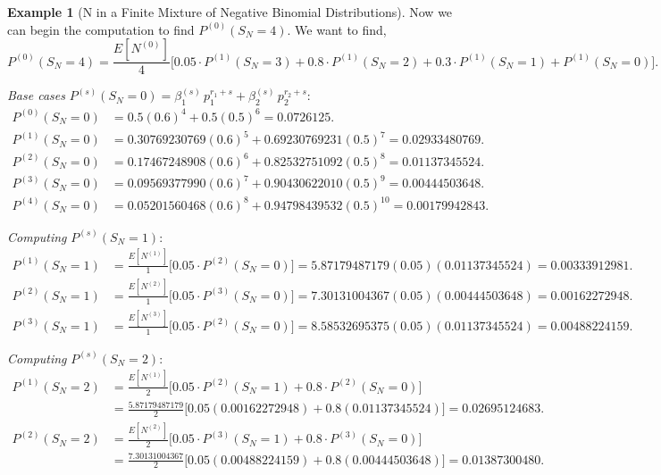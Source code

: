 \documentclass[11pt]{amsart}
\theoremstyle{definition}
\newtheorem{example}{Example}
\theoremstyle{plain}
\begin{document}
\begin{example}[N in a Finite Mixture of Negative Binomial Distributions]
Now we can begin the computation to find $P^{(0)}(S_N = 4)$.  We want to find,
\[
    P^{(0)}(S_N = 4)
    = \frac{E[N^{(0)}]}{4}
      \bigl[0.05 \cdot P^{(1)}(S_N = 3) + 0.8 \cdot P^{(1)}(S_N = 2)
      + 0.3 \cdot P^{(1)}(S_N = 1) + P^{(1)}(S_N = 0)\bigr].
\]

\noindent\textit{Base cases}
$P^{(s)}(S_N = 0) = \beta_1^{(s)}\,p_1^{r_1+s} + \beta_2^{(s)}\,p_2^{r_2+s}$:
\begin{align*}
P^{(0)}(S_N = 0)
    &= 0.5(0.6)^4 + 0.5(0.5)^6 = 0.0726125. \\
P^{(1)}(S_N = 0)
    &= 0.30769230769(0.6)^5 + 0.69230769231(0.5)^7
     = 0.02933480769. \\
P^{(2)}(S_N = 0)
    &= 0.17467248908(0.6)^6 + 0.82532751092(0.5)^8
     = 0.01137345524. \\
P^{(3)}(S_N = 0)
    &= 0.09569377990(0.6)^7 + 0.90430622010(0.5)^9
     = 0.00444503648. \\
P^{(4)}(S_N = 0)
    &= 0.05201560468(0.6)^8 + 0.94798439532(0.5)^{10}
     = 0.00179942843.
\end{align*}

\noindent\textit{Computing} $P^{(s)}(S_N = 1)$:
\begin{align*}
P^{(1)}(S_N = 1)
    &= \frac{E[N^{(1)}]}{1}\bigl[0.05 \cdot P^{(2)}(S_N = 0)\bigr]
     = 5.87179487179(0.05)(0.01137345524) = 0.00333912981. \\
P^{(2)}(S_N = 1)
    &= \frac{E[N^{(2)}]}{1}\bigl[0.05 \cdot P^{(3)}(S_N = 0)\bigr]
     = 7.30131004367(0.05)(0.00444503648) = 0.00162272948. \\
P^{(3)}(S_N = 1)
    &= \frac{E[N^{(3)}]}{1}\bigl[0.05 \cdot P^{(2)}(S_N = 0)\bigr]
     = 8.58532695375(0.05)(0.01137345524) = 0.00488224159.
\end{align*}

\noindent\textit{Computing} $P^{(s)}(S_N = 2)$:
\begin{align*}
P^{(1)}(S_N = 2)
    &= \frac{E[N^{(1)}]}{2}
       \bigl[0.05 \cdot P^{(2)}(S_N = 1) + 0.8 \cdot P^{(2)}(S_N = 0)\bigr] \\
    &= \frac{5.87179487179}{2}
       \bigl[0.05(0.00162272948) + 0.8(0.01137345524)\bigr]
     = 0.02695124683. \\
P^{(2)}(S_N = 2)
    &= \frac{E[N^{(2)}]}{2}
       \bigl[0.05 \cdot P^{(3)}(S_N = 1) + 0.8 \cdot P^{(3)}(S_N = 0)\bigr] \\
    &= \frac{7.30131004367}{2}
       \bigl[0.05(0.00488224159) + 0.8(0.00444503648)\bigr]
     = 0.01387300480.
\end{align*}


\end{example}
\end{document}
